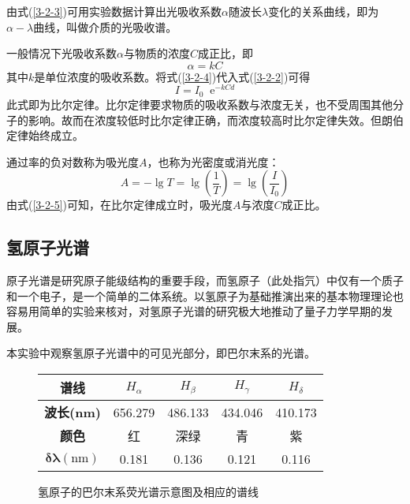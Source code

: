 \documentclass[UTF-8,twoside,cs4size]{ctexart}
\newcommand*{\me}{\mathop{}\!\mathrm{e}}
\begin{document}
	由式(\ref{3-2-3})可用实验数据计算出光吸收系数$ \alpha $随波长$ \lambda $变化的关系曲线，即为$ \alpha-\lambda $曲线，叫做介质的光吸收谱。
	
	一般情况下光吸收系数$ \alpha $与物质的浓度$ C $成正比，即
	\begin{equation}\label{3-2-4}
		\alpha=kC
	\end{equation}
	其中$ k $是单位浓度的吸收系数。将式(\ref{3-2-4})代入式(\ref{3-2-2})可得
	\begin{equation}\label{3-2-5}
		I=I_0\me^{-kCd}
	\end{equation}
	此式即为比尔定律。比尔定律要求物质的吸收系数与浓度无关，也不受周围其他分子的影响。故而在浓度较低时比尔定律正确，而浓度较高时比尔定律失效。但朗伯定律始终成立。
	
	通过率的负对数称为吸光度$ A $，也称为光密度或消光度：
	\[A=-\lg T=\lg\left(\frac1T\right)=\lg\left(\frac{I}{I_0}\right)\]
	由式(\ref{3-2-5})可知，在比尔定律成立时，吸光度$ A $与浓度$ C $成正比。
	
	\subsection{氢原子光谱}
	原子光谱是研究原子能级结构的重要手段，而氢原子（此处指氕）中仅有一个质子和一个电子，是一个简单的二体系统。以氢原子为基础推演出来的基本物理理论也容易用简单的实验来核对，对氢原子光谱的研究极大地推动了量子力学早期的发展。
	
	本实验中观察氢原子光谱中的可见光部分，即巴尔末系的光谱。
	
	\begin{figure}[h]
		\centering
		
		\renewcommand\arraystretch{1.5}
		\begin{tabular}{|c|c|c|c|c|}
			\hline
			\textbf{谱线} & $ H_\alpha $ & $ H_\beta $ & $ H_\gamma $ & $ H_\delta $\\
			\hline
			\textbf{波长(nm)} & 656.279 & 486.133 & 434.046 & 410.173\\
			\hline
			\textbf{颜色} & 红 & 深绿 & 青 & 紫\\
			\hline
			$ \bm{\delta\lambda(\mathrm{nm})} $ & 0.181 & 0.136 & 0.121 & 0.116\\
			\hline
		\end{tabular}
		\caption{氢原子的巴尔末系荧光谱示意图及相应的谱线}
	\end{figure}
\end{document}
